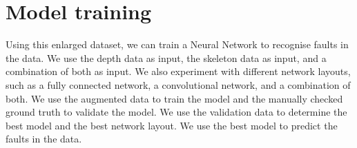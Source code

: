 \section{Model training}

Using this enlarged dataset, we can train a Neural Network to recognise faults in the data. We use the depth data as input, the skeleton data as input, and a combination of both as input. We also experiment with different network layouts, such as a fully connected network, a convolutional network, and a combination of both. We use the augmented data to train the model and the manually checked ground truth to validate the model. We use the validation data to determine the best model and the best network layout. We use the best model to predict the faults in the data. 